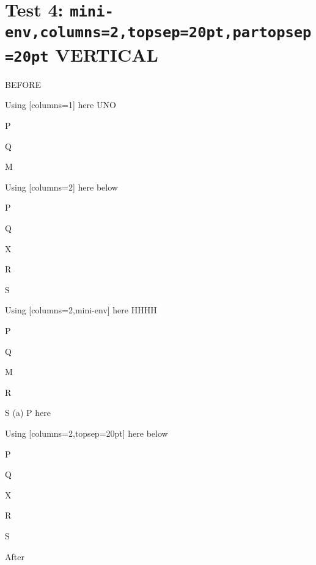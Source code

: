 \documentclass[10pt]{article}
\begin{document}
\newpage

\section{Test 4: \texttt{mini-env,columns=2,topsep=20pt,partopsep=20pt} VERTICAL}

BEFORE
\begin{enumext}[columns=2]
\item Using [columns=1] here UNO

  \begin{enumext}[columns=1,topsep=20pt,partopsep=20pt]%
     \item  P \item Q \item M %
  \end{enumext}

\item Using [columns=2] here below

\begin{enumext}[columns=2,topsep=20pt,,partopsep=20pt]%
     \item  P \item Q \item X  \item R \item S
  \end{enumext}

\columnbreak

\item Using [columns=2,mini-env] here HHHH

  \begin{enumext}[columns=2,mini-env={0.4\linewidth},topsep=20pt,partopsep=20pt]%
    \item  P \item Q \item M \item R \item S
    \miniright
    (a) P here
  \end{enumext}

\item Using [columns=2,topsep=20pt] here below

\begin{enumext}[columns=2,topsep=20pt,partopsep=20pt]%
     \item  P \item Q \item X  \item R \item S
  \end{enumext}

\end{enumext}
After
\end{document}

